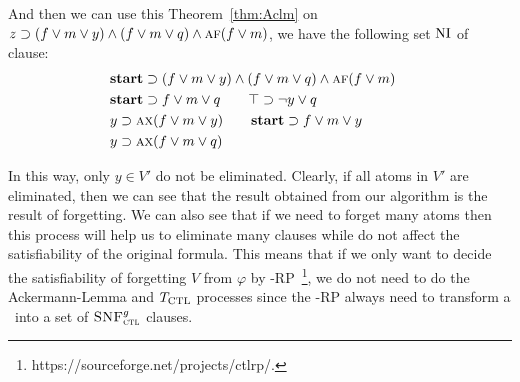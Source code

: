 \documentclass[letterpaper]{article}
\begin{document}
And then we can use this Theorem~\ref{thm:Aclm} on $z \supset (f \vee m \vee y) \wedge (f \vee m\vee q) \wedge \textsc{a} \textsc{f} (f \vee m)$, we have the following set $\textrm{NI}$ of clause:
\begin{align*}
 & \textbf{start}\supset (f \vee m \vee y) \wedge (f \vee m\vee q) \wedge \textsc{a} \textsc{f} (f \vee m) && \\
 &  \textbf{start} \supset f\vee m \vee q \qquad \top \supset \neg y \vee q\\
 & y \supset \textsc{a} \textsc{x}(f \vee m \vee y) \qquad \textbf{start} \supset f \vee m \vee y \\
&  y \supset \textsc{a}\textsc{x}(f \vee m\vee q) \qquad   \\
\end{align*}

In this way, only $y\in V'$ do not be eliminated. 
Clearly, if all atoms in $V'$ are eliminated, then we can see that the result obtained from our algorithm is the result of forgetting.
We can also see that if we need to forget many atoms then this process will help us to eliminate many clauses while do not affect the satisfiability of the original formula.
This means that if we only want to decide the satisfiability of forgetting $V$ from $\varphi$ by \CTL-RP~\footnote{https://sourceforge.net/projects/ctlrp/.}, we do not need to do the Ackermann-Lemma and $T_{\textrm{CTL}}$ processes since the \CTL-RP always need to transform a \CTL\ into a set of ${\textsc{SNF}_{\textsc{ctl}}^g}$ clauses. 



\end{document}
